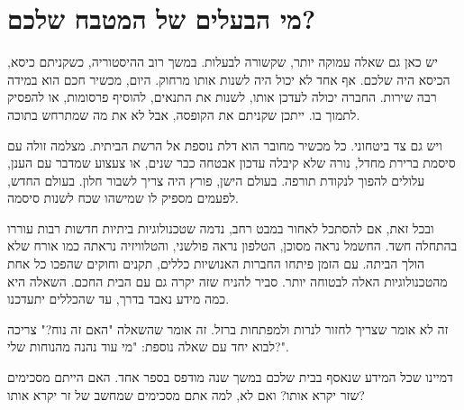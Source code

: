 \section{מי הבעלים של המטבח שלכם?}

יש כאן גם שאלה עמוקה יותר, שקשורה לבעלות. במשך רוב ההיסטוריה, כשקניתם כיסא, הכיסא היה שלכם. אף אחד לא יכול היה לשנות אותו מרחוק. היום, מכשיר חכם הוא במידה רבה שירות. החברה יכולה לעדכן אותו, לשנות את התנאים, להוסיף פרסומות, או להפסיק לתמוך בו. ייתכן שקניתם את הקופסה, אבל לא את מה שמתרחש בתוכה.

ויש גם צד ביטחוני. כל מכשיר מחובר הוא דלת נוספת אל הרשת הביתית. מצלמה זולה עם סיסמת ברירת מחדל, נורה שלא קיבלה עדכון אבטחה כבר שנים, או צעצוע שמדבר עם הענן, עלולים להפוך לנקודת תורפה. בעולם הישן, פורץ היה צריך לשבור חלון. בעולם החדש, לפעמים מספיק לו שמישהו שכח לשנות סיסמה.

ובכל זאת, אם להסתכל לאחור במבט רחב, נדמה שטכנולוגיות ביתיות חדשות רבות עוררו בהתחלה חשד. החשמל נראה מסוכן, הטלפון נראה פולשני, והטלוויזיה נראתה כמו אורח שלא הולך הביתה. עם הזמן פיתחו החברות האנושיות כללים, תקנים וחוקים שהפכו כל אחת מהטכנולוגיות האלה לבטוחה יותר. סביר להניח שזה יקרה גם עם הבית החכם. השאלה היא כמה מידע נאבד בדרך, עד שהכללים יתעדכנו.

זה לא אומר שצריך לחזור לנרות ולמפתחות ברזל. זה אומר שהשאלה "האם זה נוח?" צריכה לבוא יחד עם שאלה נוספת: "מי עוד נהנה מהנוחות שלי?".

\begin{thinkbox}
דמיינו שכל המידע שנאסף בבית שלכם במשך שנה מודפס בספר אחד. האם הייתם מסכימים שזר יקרא אותו? ואם לא, למה אתם מסכימים שמחשב של זר יקרא אותו?
\end{thinkbox}
